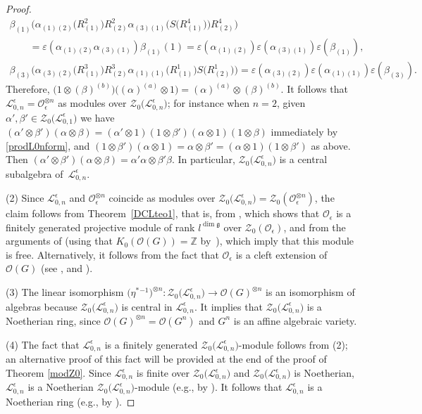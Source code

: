 \documentclass[10pt,a4paper]{amsart}
\numberwithin{equation}{section}
\theoremstyle{definition}
\newcommand{\e}{\epsilon}
\newcommand{\mz}{\mathbb{Z}}
\newcommand{\Ll}{{\mathcal L}}
\newcommand{\Oo}{{\mathcal O}}
\newcommand{\ra}{\rightarrow}
\begin{document}
\begin{proof}
\begin{gather*}
 \beta_{(1)}\big(\alpha_{(1)(2)}\big(R^2_{(1)}\big) R^2_{(2)} \alpha_{(3)(1)}\big(S\big(R^4_{(1)}\big)\big) R^4_{(2)}\big) \\
 \qquad = \varepsilon(\alpha_{(1)(2)}\alpha_{(3)(1)})\beta_{(1)}(1) = \varepsilon(\alpha_{(1)(2)})\varepsilon(\alpha_{(3)(1)})\varepsilon(\beta_{(1)}),\\
\beta_{(3)}\big(\alpha_{(3)(2)}\big(R^3_{(1)}\big)R^3_{(2)} \alpha_{(1)(1)}\big(R^1_{(1)}\big) S\big(R^1_{(2)}\big)\big) = \varepsilon(\alpha_{(3)(2)})\varepsilon(\alpha_{(1)(1)})\varepsilon(\beta_{(3)}).
\end{gather*}
Therefore, $\big(1\otimes (\beta)^{(b)}\big)\big((\alpha)^{(a)} \otimes 1\big) = (\alpha)^{(a)}\otimes (\beta)^{(b)}$. It follows that $\Ll_{0,n}^\e = \Oo_\e^{\otimes n}$ as modules over $\mathcal{Z}_0\bigl(\Ll_{0,n}^\e\bigr)$; for instance when $n=2$, given $\alpha',\beta'\in \mathcal{Z}_0\bigl(\Ll_{0,1}^\e\bigr)$ we have $(\alpha'\otimes \beta')(\alpha\otimes \beta) = (\alpha'\otimes 1)(1\otimes \beta')(\alpha\otimes 1)(1\otimes \beta)$ immediately by \eqref{prodL0nform}, and $(1\otimes \beta')(\alpha\otimes 1) = \alpha\otimes \beta' = (\alpha\otimes 1)(1\otimes \beta')$ as above. Then $(\alpha'\otimes \beta')(\alpha\otimes \beta) = \alpha'\alpha\otimes \beta'\beta$. In particular, $\mathcal{Z}_0\bigl(\Ll_{0,n}^\e\bigr)$ is a central subalgebra of~$\Ll_{0,n}^\e$.

(2) Since $\Ll_{0,n}^\e$ and $\Oo_\e^{\otimes n}$ coincide as modules over $\mathcal{Z}_0\big(\Ll_{0,n}^\e\big)=\mathcal{Z}_0(\Oo_\e^{\otimes n})$, the claim follows from Theorem~\ref{DCLteo1}, that is, from \cite[Theorem~7.2]{DC-L}, which shows that $\Oo_\e$ is a finitely generated projective module of rank $l^{\dim \mathfrak{g}}$ over $\mathcal{Z}_0(\Oo_\e)$, and from the arguments of \cite{BGS} (using that $K_0(\mathcal{O}(G))=\mz$ by~\cite{Marlin}), which imply that this module is free. Alternatively, it follows from the fact that $\Oo_\e$ is a cleft extension of $\Oo(G)$ (see \cite[Remark~2.18\,(b)]{AnGa}, and \cite[Section~3.2]{BC}).

(3) The linear isomorphism $\big(\eta^*{}^{-1}\big)^{\otimes n}\colon \mathcal{Z}_0\bigl(\Ll_{0,n}^\e\bigr)\ra\Oo(G)^{\otimes n}$ is an isomorphism of algebras because $\mathcal{Z}_0\bigl(\Ll_{0,n}^\e\bigr)$ is central in $\Ll_{0,n}^\e$. It implies that $\mathcal{Z}_0\bigl(\Ll_{0,n}^\e\bigr)$ is a Noetherian ring, since $\Oo(G)^{\otimes n} = \Oo(G^n)$ and $G^n$ is an affine algebraic variety.

(4) The fact that $\Ll_{0,n}^\e$ is a finitely generated $\mathcal{Z}_0\bigl(\Ll_{0,n}^\e\bigr)$-module follows from (2); an alternative proof of this fact will be provided at the end of the proof of Theorem \ref{modZ0}. Since $\Ll_{0,n}^\e$ is finite over $\mathcal{Z}_0\bigl(\Ll_{0,n}^\e\bigr)$ and $\mathcal{Z}_0\bigl(\Ll_{0,n}^\e\bigr)$ is Noetherian, $\Ll_{0,n}^\e$ is a Noetherian $\mathcal{Z}_0\bigl(\Ll_{0,n}^\e\bigr)$-module (e.g., by \cite[Proposition~6.5]{AM}). It follows that $\Ll_{0,n}^\e$ is a Noetherian ring (e.g., by \cite[Chapter~1, Section~1.3]{MC-R}).
\end{proof}
\end{document}
